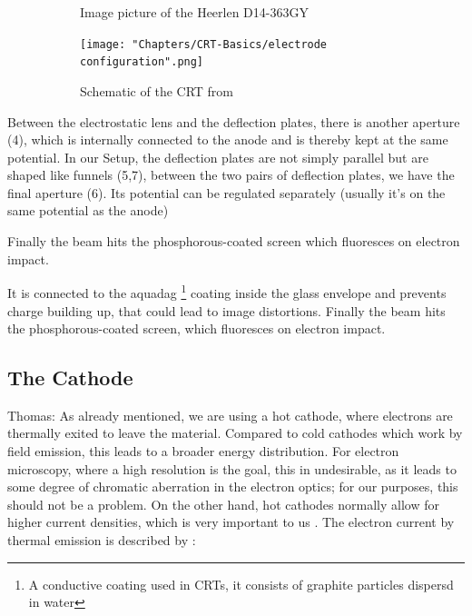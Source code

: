 \begin{figure}
	\centering
	\begin{subfigure}{.5\textwidth}
		\centering
		\caption{Image picture of the Heerlen D14-363GY}
		\label{fig:FotoCRT}
	\end{subfigure}%
	\begin{subfigure}{.5\textwidth}
		\centering
		\texttt{[image: "Chapters/CRT-Basics/electrode configuration".png]}
		\caption{Schematic of the CRT from \cite{D14363GY123-manual}}
		\label{fig:SchemeCRT}
	\end{subfigure}
	\caption{}
	\label{}
\end{figure}


Between the electrostatic lens and the deflection plates, there is another aperture (4), which is internally connected to the anode and is thereby kept at the same potential. In our Setup, the deflection plates are not simply parallel but are shaped like funnels (5,7), between the two pairs of deflection plates, we have the final aperture (6). Its potential can be regulated separately (usually it's on the same potential as the anode) 


Finally the beam hits the phosphorous-coated screen which fluoresces on electron impact.

It is connected to the aquadag \footnote{A conductive coating used in CRTs, it consists of graphite particles dispersd in water} coating inside the glass envelope and prevents charge building up, that could lead to image distortions. 
Finally the beam hits the phosphorous-coated screen, which fluoresces on electron impact.

\subsection{The Cathode}

 
Thomas: As already mentioned, we are using a hot cathode, where electrons are thermally exited  to leave the material. Compared to cold cathodes which work by field emission, this leads to a broader energy distribution. For electron microscopy, where a high resolution is the goal, this in undesirable, as it leads to some degree of chromatic aberration in the electron optics; for our purposes, this should not be a problem. On the other hand, hot cathodes normally allow for higher current densities, which is very important to us . The  electron current by thermal emission is described by \cite[chp 3.2.3]{Whitaker}: 

